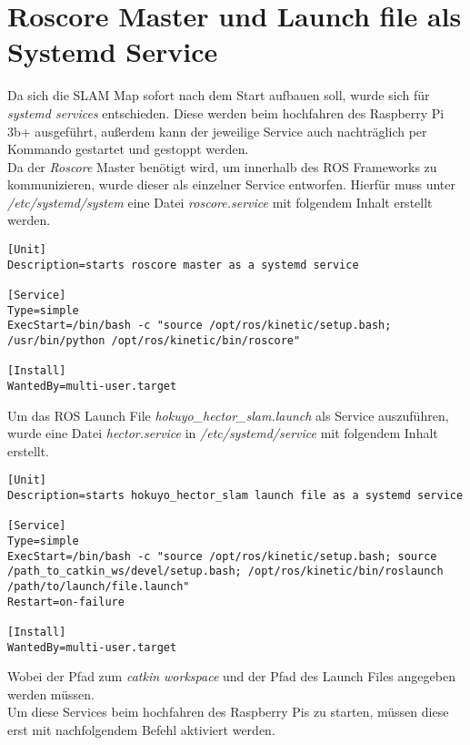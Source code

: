 \vspace{-1.2cm}










\section{Roscore Master und Launch file als Systemd Service}
Da sich die SLAM Map sofort nach dem Start aufbauen soll, wurde sich für \textit{systemd services} entschieden. Diese werden beim hochfahren des Raspberry Pi 3b+ ausgeführt, außerdem kann der jeweilige Service auch nachträglich per Kommando gestartet und gestoppt werden.\\ 
Da der \textit{Roscore} Master benötigt wird, um innerhalb des ROS Frameworks zu kommunizieren, wurde dieser als einzelner Service entworfen. Hierfür muss unter \textit{/etc/systemd/system} eine Datei \textit{roscore.service} mit folgendem Inhalt erstellt werden.\\


\begin{lstlisting}
[Unit]
Description=starts roscore master as a systemd service

[Service]
Type=simple
ExecStart=/bin/bash -c "source /opt/ros/kinetic/setup.bash; /usr/bin/python /opt/ros/kinetic/bin/roscore"

[Install]
WantedBy=multi-user.target
\end{lstlisting}

\vspace{-0.9cm}
Um das ROS Launch File \textit{hokuyo\_hector\_slam.launch} als Service auszuführen, wurde eine Datei \textit{hector.service} in \textit{/etc/systemd/service} mit folgendem Inhalt erstellt.\\

\begin{lstlisting}
[Unit]
Description=starts hokuyo_hector_slam launch file as a systemd service

[Service]
Type=simple
ExecStart=/bin/bash -c "source /opt/ros/kinetic/setup.bash; source /path_to_catkin_ws/devel/setup.bash; /opt/ros/kinetic/bin/roslaunch /path/to/launch/file.launch"
Restart=on-failure

[Install]
WantedBy=multi-user.target
\end{lstlisting}

Wobei der Pfad zum \textit{catkin workspace} und der Pfad des Launch Files angegeben werden müssen.\\
Um diese Services beim hochfahren des Raspberry Pis zu starten, müssen diese erst mit nachfolgendem Befehl aktiviert werden.\\

